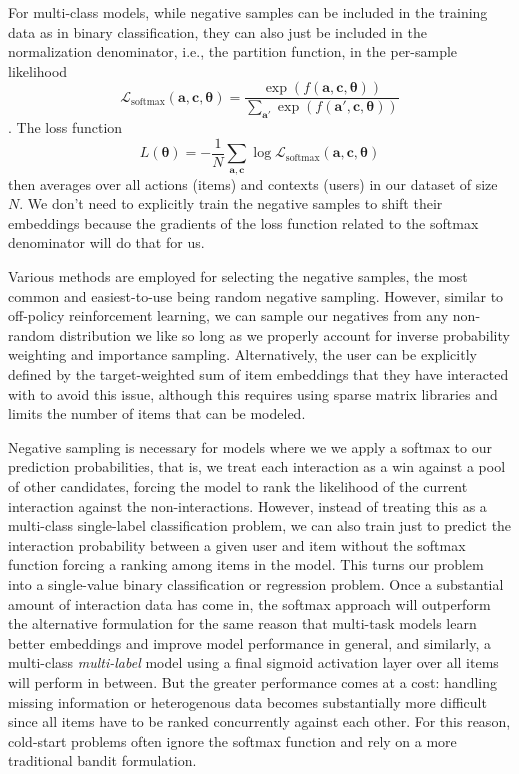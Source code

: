 \documentclass{article}
\begin{document}
For multi-class models, while negative samples can be included in the training data as in binary classification, they can also just be included in the normalization denominator, i.e., the partition function, in the per-sample likelihood \begin{equation}\mathcal{L}_\text{softmax}(\mathbf{a},\mathbf{c},\boldsymbol{\theta})=\frac{\exp(f(\mathbf{a},\mathbf{c},\boldsymbol{\theta}))}{\sum_{\mathbf{a}'}\exp(f(\mathbf{a}',\mathbf{c},\boldsymbol{\theta}))}
\end{equation}. The loss function \begin{equation}L(\boldsymbol{\theta})=-\frac{1}{N}\sum_{\mathbf{a},\mathbf{c}}\log\mathcal{L}_\text{softmax}(\mathbf{a},\mathbf{c},\boldsymbol{\theta})\end{equation}then averages over all actions (items) and contexts (users) in our dataset of size $N$. We don't need to explicitly train the negative samples to shift their embeddings because the gradients of the loss function related to the softmax denominator will do that for us.

Various methods are employed for selecting the negative samples, the most common and easiest-to-use being random negative sampling. However, similar to off-policy reinforcement learning, we can sample our negatives from any non-random distribution we like so long as we properly account for inverse probability weighting and importance sampling\cite{bengio_negative_sampling}. Alternatively, the user can be explicitly defined by the target-weighted sum of item embeddings that they have interacted with to avoid this issue, although this requires using sparse matrix libraries and limits the number of items that can be modeled.

Negative sampling is necessary for models where we we apply a softmax to our prediction probabilities, that is, we treat each interaction as a win against a pool of other candidates, forcing the model to rank the likelihood of the current interaction against the non-interactions. However, instead of treating this as a multi-class single-label classification problem, we can also train just to predict the interaction probability between a given user and item without the softmax function forcing a ranking among items in the model. This turns our problem into a single-value binary classification or regression problem. Once a substantial amount of interaction data has come in, the softmax approach will outperform the alternative formulation for the same reason that multi-task models learn better embeddings and improve model performance in general, and similarly, a multi-class \textit{multi-label} model using a final sigmoid activation layer over all items will perform in between. But the greater performance comes at a cost: handling missing information or heterogenous data becomes substantially more difficult since all items have to be ranked concurrently against each other. For this reason, cold-start problems often ignore the softmax function and rely on a more traditional bandit formulation.
\end{document}

